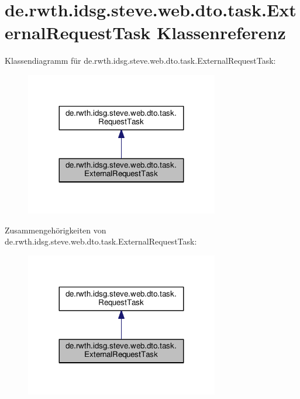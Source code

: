\hypertarget{classde_1_1rwth_1_1idsg_1_1steve_1_1web_1_1dto_1_1task_1_1_external_request_task}{\section{de.\+rwth.\+idsg.\+steve.\+web.\+dto.\+task.\+External\+Request\+Task Klassenreferenz}
\label{classde_1_1rwth_1_1idsg_1_1steve_1_1web_1_1dto_1_1task_1_1_external_request_task}
}


Klassendiagramm für de.\+rwth.\+idsg.\+steve.\+web.\+dto.\+task.\+External\+Request\+Task\+:\nopagebreak
\begin{figure}[H]
\begin{center}
\leavevmode
\includegraphics[width=239pt]{classde_1_1rwth_1_1idsg_1_1steve_1_1web_1_1dto_1_1task_1_1_external_request_task__inherit__graph}
\end{center}
\end{figure}


Zusammengehörigkeiten von de.\+rwth.\+idsg.\+steve.\+web.\+dto.\+task.\+External\+Request\+Task\+:\nopagebreak
\begin{figure}[H]
\begin{center}
\leavevmode
\includegraphics[width=239pt]{classde_1_1rwth_1_1idsg_1_1steve_1_1web_1_1dto_1_1task_1_1_external_request_task__coll__graph}
\end{center}
\end{figure}
